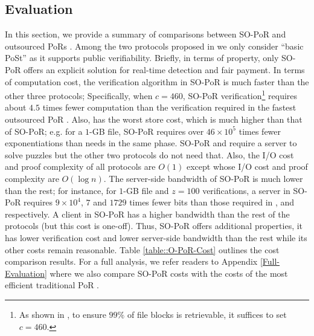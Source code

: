 \vspace{-3mm}

\subsection{Evaluation}

In this section, we provide a summary of comparisons between   SO-PoR and outsourced PoRs  \cite{armknecht2014outsourced,xu2016lightweight,Storage-Time}. Among the two protocols proposed in \cite{Storage-Time} we only consider ``basic PoSt'' as it supports public verifiability. Briefly, in terms of property, only SO-PoR offers an explicit solution for real-time detection and fair payment. In terms of computation cost, the verification algorithm in SO-PoR is much faster than the other three protocols; Specifically, when $c=460$,  SO-PoR verification\footnote{As shown in \cite{DBLP:conf/ccs/AtenieseBCHKPS07}, to ensure $99\%$ of file blocks is retrievable, it  suffices to set $c=460$.} requires about $4.5$ times fewer computation than the verification required in the fastest outsourced PoR \cite{armknecht2014outsourced}.   Also, \cite{armknecht2014outsourced} has the worst store cost, which is  much higher than that of SO-PoR; e.g. for a $1$-GB file, SO-PoR requires over $46 \times 10^{\scriptscriptstyle 5}$ times fewer exponentiations than \cite{armknecht2014outsourced} needs in the same phase.  SO-PoR and \cite{Storage-Time} require a server to solve puzzles but the other two protocols do not need that. Also, the I/O cost and proof complexity of all protocols are $O(1)$ except \cite{Storage-Time} whose I/O cost and proof complexity are $O(\log n)$. The server-side bandwidth of SO-PoR is much lower than the rest;  for instance, for $1$-GB file and $z=100$ verifications, a server in SO-PoR requires $9\times 10^{\scriptscriptstyle4}$,  $7$ and $1729$ times fewer bits  than those required in \cite{armknecht2014outsourced}, \cite{xu2016lightweight} and \cite{Storage-Time} respectively.  A client in SO-PoR has a higher bandwidth than the rest of the protocols (but this cost is one-off). Thus, SO-PoR offers additional properties, it has lower verification cost and lower server-side bandwidth than the rest while its other costs remain reasonable. Table \ref{table::O-PoR-Cost} outlines the cost comparison results. For a  full analysis, we refer readers to Appendix \ref{Full-Evaluation} where  we also compare SO-PoR costs with the costs of the most efficient  traditional PoR  \cite{DBLP:conf/asiacrypt/ShachamW08}.


